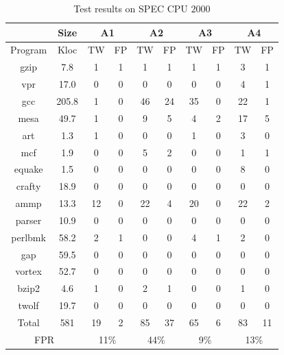 \begin{table}[!h]
\center
\caption{Test results on SPEC CPU $2000$}\label{tab:4}
\hspace{-0.5cm}\begin{tabular}{|c|c|c|c|c|c|c|c|c|c|}
\hline
& \textbf{Size} & \multicolumn{2}{|c|}{\textbf{A1}} & \multicolumn{2}{|c|}{\textbf{A2}} & \multicolumn{2}{|c|}{\textbf{A3}} & \multicolumn{2}{|c|}{\textbf{A4}}\\
\hline
Program & Kloc & TW & FP & TW & FP & TW & FP & TW & FP\\
\hline
gzip       & 7.8    & 1  & 1 & 1	& 1   & 1   & 1  & 3  & 1\\
\hline
vpr        & 17.0   & 0  & 0 & 0	 & 0   & 0  &	0  &	4   &1\\
\hline
gcc        & 205.8 & 1  & 0 & 46 & 24 & 35 &	0  & 22 & 1\\
\hline
mesa     & 49.7   & 1  & 0 & 9	 & 5	   & 4  & 2  & 17 & 5\\
\hline
art         & 1.3     & 1  & 0 &0   & 0	   & 1  &	0   & 3  & 0\\
\hline
mcf        & 1.9     & 0  & 0 & 5  &  2  & 0   & 0  & 1  & 1\\
\hline
equake   & 1.5     & 0  & 0 & 0	 & 0   &	0  & 0   & 8  & 0\\
\hline
crafty     & 18.9   & 0	 & 0	 & 0	 & 0	  & 0   & 0   & 0   & 0\\
\hline
ammp    & 13.3   & 12 & 0 & 22 & 4  & 	20 & 0  & 22 & 2\\
\hline
parser    & 10.9   & 0	 & 0	 & 0	   &0  & 0    & 0  & 0  & 0\\
\hline
perlbmk & 58.2   & 2   & 1	 & 0	   & 0  &	4   & 1  & 2  & 0\\
\hline
gap        & 59.5   &  0 & 0 & 0    & 	0  &	0   & 0   & 0	& 0\\
\hline
vortex    & 52.7    & 0	 & 0	 & 0	   & 0  &	0   & 0   & 0	& 0\\
\hline 
bzip2     & 4.6      & 1 & 0	 & 2	   & 1  &	0   & 0   & 1	& 0\\
\hline
twolf     & 19.7     & 0 & 0	 & 0	   & 0  &	0   & 0   & 0	& 0\\
\hline
Total     & 581      & 19 & 2 & 85 &	37 & 65 & 6	& 83 & 11\\
\hline
\multicolumn{2}{|c|}{FPR} & \multicolumn{2}{|c|}{11\%} & \multicolumn{2}{|c|}{44\%} & \multicolumn{2}{|c|}{9\%}  &\multicolumn{2}{|c|}{13\%}\\
\hline
\end{tabular}
\end{table}

